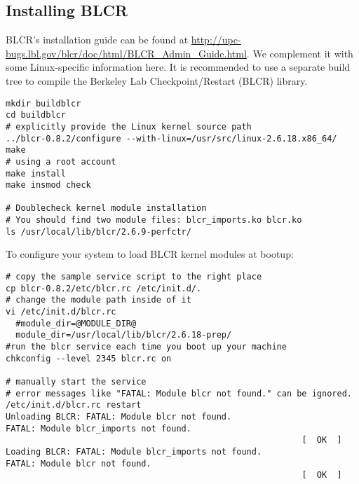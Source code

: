 \subsection{Installing BLCR}
BLCR's installation guide can be found at
\url{http://upc-bugs.lbl.gov/blcr/doc/html/BLCR_Admin_Guide.html}.
We complement it with some Linux-specific information here.
It is recommended to use a separate build tree to compile the Berkeley Lab Checkpoint/Restart (BLCR) library.
\begin{verbatim}
mkdir buildblcr
cd buildblcr
# explicitly provide the Linux kernel source path 
../blcr-0.8.2/configure --with-linux=/usr/src/linux-2.6.18.x86_64/
make
# using a root account
make install
make insmod check

# Doublecheck kernel module installation 
# You should find two module files: blcr_imports.ko blcr.ko 
ls /usr/local/lib/blcr/2.6.9-perfctr/ 
\end{verbatim}
To configure your system to load BLCR kernel modules at bootup:
\begin{verbatim}
# copy the sample service script to the right place
cp blcr-0.8.2/etc/blcr.rc /etc/init.d/.
# change the module path inside of it 
vi /etc/init.d/blcr.rc
  #module_dir=@MODULE_DIR@
  module_dir=/usr/local/lib/blcr/2.6.18-prep/
#run the blcr service each time you boot up your machine
chkconfig --level 2345 blcr.rc on

# manually start the service 
# error messages like "FATAL: Module blcr not found." can be ignored. 
/etc/init.d/blcr.rc restart
Unloading BLCR: FATAL: Module blcr not found.
FATAL: Module blcr_imports not found.
                                                           [  OK  ]
Loading BLCR: FATAL: Module blcr_imports not found.
FATAL: Module blcr not found.
                                                           [  OK  ]

\end{verbatim}


